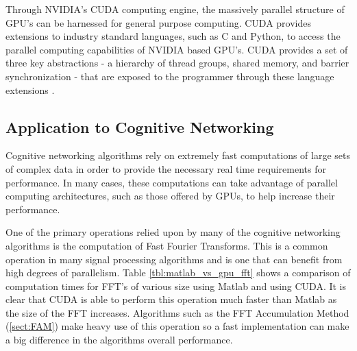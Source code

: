 Through NVIDIA's CUDA computing engine, the massively parallel structure of GPU's can be harnessed for general purpose computing.  CUDA provides extensions to industry standard languages, such as C and Python, to access the parallel computing capabilities of NVIDIA based GPU's.  CUDA provides a set of three key abstractions - a hierarchy of thread groups, shared memory, and barrier synchronization - that are exposed to the programmer through these language extensions \cite{Nvidia08}.

\subsection{Application to Cognitive Networking}
Cognitive networking algorithms rely on extremely fast computations of large sets of complex data in order to provide the necessary real time requirements for performance.  In many cases, these computations can take advantage of parallel computing architectures, such as those offered by GPUs, to help increase their performance.

One of the primary operations relied upon by many of the cognitive networking algorithms is the computation of Fast Fourier Transforms.  This is a common operation in many signal processing algorithms and is one that can benefit from high degrees of parallelism.  Table \ref{tbl:matlab_vs_gpu_fft} shows a comparison of computation times for FFT's of various size using Matlab and using CUDA.  It is clear that CUDA is able to perform this operation much faster than  Matlab as the size of the FFT increases.  Algorithms such as the FFT Accumulation Method (\ref{sect:FAM}) make heavy use of this operation so a fast implementation can make a big difference in the algorithms overall performance.

